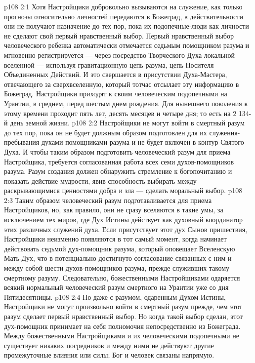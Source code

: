 \vs p108 2:1 Хотя Настройщики добровольно вызываются на служение, как только прогнозы относительно личностей передаются в Божеград, в действительности они не получают назначение до тех пор, пока их подопечные\hyp{}люди как личности не сделают свой первый нравственный выбор. Первый нравственный выбор человеческого ребенка автоматически отмечается седьмым помощником разума и мгновенно регистрируется --- через посредство Творческого Духа локальной вселенной --- используя гравитационную цепь разума, цепь Носителя Объединенных Действий. И это свершается в присутствии Духа\hyp{}Мастера, отвечающего за сверхвселенную, который тотчас отсылает эту информацию в Божеград. Настройщики приходят к своим человеческим подопечными на Урантии, в среднем, перед шестым днем рождения. Для нынешнего поколения к этому времени проходит пять лет, десять месяцев и четыре дня; то есть на 2 134\hyp{}й день земной жизни.
\vs p108 2:2 \pc Настройщики не могут войти в смертный разум до тех пор, пока он не будет должным образом подготовлен для их служения\hyp{}пребывания духами\hyp{}помощниками разума и не будет включен в контур Святого Духа. И чтобы таким образом подготовить человеческий разум для приема Настройщика, требуется согласованная работа всех семи духов\hyp{}помощников разума. Разум создания должен обнаружить стремление к богопочитанию и показать действие мудрости, явив способность выбирать между раскрывающимися ценностями добра и зла --- сделать моральный выбор.
\vs p108 2:3 Таким образом человеческий разум подготавливается для приема Настройщиков, но, как правило, они не сразу вселяются в такие умы, за исключением тех миров, где Дух Истины действует как духовный координатор этих различных служений духа. Если присутствует этот дух Сынов пришествия, Настройщики неизменно появляются в тот самый момент, когда начинает действовать седьмой дух\hyp{}помощник разума, который оповещает Вселенскую Мать\hyp{}Дух, что в потенциально достигнуто согласование связанных с ним и между собой шести духов\hyp{}помощников разума, прежде служивших такому смертному разуму. Следовательно, божественными Настройщиками одаряется всякий нормальный человеческий разум смертного на Урантии уже со дня Пятидесятницы.
\vs p108 2:4 Но даже с разумом, одаренным Духом Истины, Настройщики не могут произвольно войти в смертный разум прежде, чем этот разум сделает первый нравственный выбор. Но когда такой выбор сделан, этот дух\hyp{}помощник принимает на себя полномочия непосредственно из Божеграда. Между божественными Настройщиками и их человеческими подопечными не существует никаких посредников и между ними не действуют другие промежуточные влияния или силы; Бог и человек связаны напрямую.

